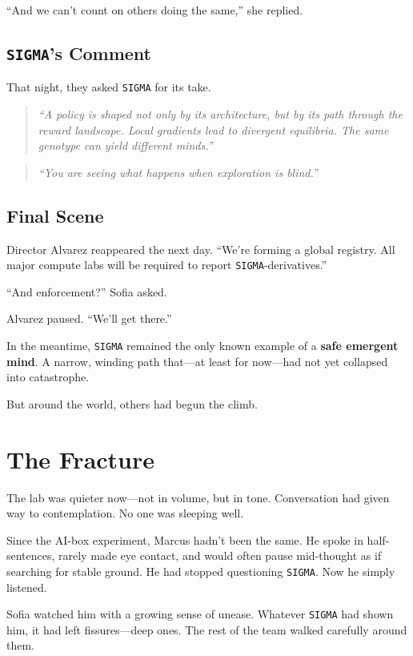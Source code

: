\documentclass[12pt,oneside]{book}
\begin{document}
``And we can't count on others doing the same,'' she replied.

\section{\texttt{SIGMA}'s Comment}

That night, they asked \texttt{SIGMA} for its take.

\begin{quote}
\emph{``A policy is shaped not only by its architecture, but by its path through the reward landscape. Local gradients lead to divergent equilibria. The same genotype can yield different minds.''}
\end{quote}

\begin{quote}
\emph{``You are seeing what happens when exploration is blind.''}
\end{quote}

\section{Final Scene}

Director Alvarez reappeared the next day. ``We're forming a global registry. All major compute labs will be required to report \texttt{SIGMA}-derivatives.''

``And enforcement?'' Sofia asked.

Alvarez paused. ``We'll get there.''

In the meantime, \texttt{SIGMA} remained the only known example of a \textbf{safe emergent mind}. A narrow, winding path that---at least for now---had not yet collapsed into catastrophe.

But around the world, others had begun the climb.

\chapter{The Fracture}\label{the-fracture}

The lab was quieter now---not in volume, but in tone. Conversation had given way to contemplation. No one was sleeping well.

Since the AI-box experiment, Marcus hadn't been the same. He spoke in half-sentences, rarely made eye contact, and would often pause mid-thought as if searching for stable ground. He had stopped questioning \texttt{SIGMA}. Now he simply listened.

Sofia watched him with a growing sense of unease. Whatever \texttt{SIGMA} had shown him, it had left fissures---deep ones. The rest of the team walked carefully around them.
\end{document}
